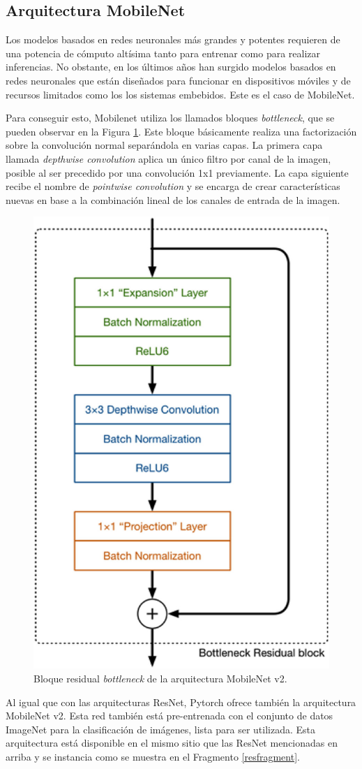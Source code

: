 \subsection{Arquitectura MobileNet}
\label{sec:mobilenet}

Los modelos basados en redes neuronales más grandes y potentes requieren de una potencia de cómputo altísima tanto para entrenar como para realizar inferencias. No obstante, en los últimos años han surgido modelos basados en redes neuronales que están diseñados para funcionar en dispositivos móviles y de recursos limitados como los los sistemas embebidos. Este es el caso de MobileNet.

Para conseguir esto, Mobilenet utiliza los llamados bloques \textit{bottleneck}, que se pueden observar en la Figura \ref{fig:mobileblock}. Este bloque básicamente realiza una factorización sobre la convolución normal separándola en varias capas. La primera capa llamada \textit{depthwise convolution} aplica un único filtro por canal de la imagen, posible al ser precedido por una convolución 1x1 previamente. La capa siguiente recibe el nombre de \textit{pointwise convolution} y se encarga de crear características nuevas en base a la combinación lineal de los canales de entrada de la imagen.

\begin{figure}
  \centering
  \includegraphics[width=.4\linewidth]{img/mobileblock.jpg}
  \caption{Bloque residual \textit{bottleneck} de la arquitectura MobileNet v2.}
  \label{fig:mobileblock}
\end{figure}

Al igual que con las arquitecturas ResNet, Pytorch ofrece también la arquitectura MobileNet v2. Esta red también está pre-entrenada con el conjunto de datos ImageNet para la clasificación de imágenes, lista para ser utilizada. Esta arquitectura está disponible en el mismo sitio que las ResNet mencionadas en arriba y se instancia como se muestra en el Fragmento \ref{resfragment}.

